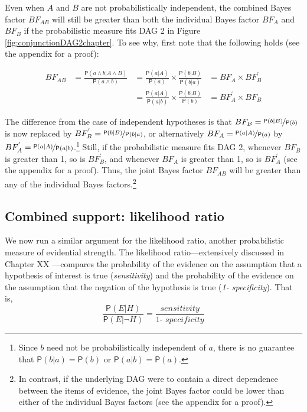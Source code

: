\documentclass[
  10pt,
  dvipsnames,enabledeprecatedfontcommands]{scrartcl}
\newcommand{\pr}[1]{\ensuremath{\mathsf{P}(#1)}}
\begin{document}
Even when \(A\) and \(B\) are not probabilistically independent, the
combined Bayes factor \(BF_{AB}\) will still be greater than both the
individual Bayes factor \(BF_{A}\) and \(BF_{B}\) if the probabilistic
measure fits \textsf{DAG 2} in Figure \ref{fig:conjunctionDAG2chapter}.
To see why, first note that the following holds (see the appendix for a
proof):

\begin{align}
BF_{AB}&= \frac{\pr{a \wedge b\vert A\wedge B}}{\pr{a \wedge b}}&= \frac{\pr{a |A}}{\pr{a}} \times \frac{\pr{b |B}}{\pr{b|a}}&=  BF_{A}\times BF^{'}_{B} \nonumber \\
& & = \frac{\pr{a |A}}{\pr{a | b}} \times \frac{\pr{b |B}}{\pr{b}}& =  BF^{'}_{A}\times BF_{B}  \nonumber 
 \end{align}

\noindent The difference from the case of independent hypotheses is that
\(BF_B=\nicefrac{\pr{b \vert B}}{\pr{b}}\) is now replaced by
\(BF^{'}_B=\nicefrac{\pr{b \vert B}}{\pr{b\vert a}}\), or alternatively
\(BF_A=\nicefrac{\pr{a \vert A}}{\pr{a}}\) by
\(BF^{'}_A=\nicefrac{\pr{a \vert A}}{\pr{a\vert b}}\).\footnote{Since
  \(b\) need not be probabilistically independent of \(a\), there is no
  guarantee that \(\pr{b \vert a}=\pr{b}\) or \(\pr{a \vert b}=\pr{a}\).}
Still, if the probabilistic measure fits \textsf{DAG 2}, whenever
\(BF_B\) is greater than 1, so is \(BF^{'}_B\), and whenever \(BF_A\) is
greater than 1, so is \(BF^{'}_A\) (see the appendix for a proof). Thus,
the joint Bayes factor \(BF_{AB}\) will be greater than any of the
individual Bayes factors.\footnote{In contrast, if the underlying
  \textsf{DAG} were to contain a direct dependence between the items of
  evidence, the joint Bayes factor could be lower than either of the
  individual Bayes factors (see the appendix for a proof).}

\hypertarget{combined-support-likelihood-ratio}{%
\subsection{Combined support: likelihood
ratio}\label{combined-support-likelihood-ratio}}

We now run a similar argument for the likelihood ratio, another
probabilistic measure of evidential strength. The likelihood
ratio---extensively discussed in Chapter XX
---compares the probability of the
evidence on the assumption that a hypothesis of interest is true
(\textit{sensitivity}) and the probability of the evidence on the
assumption that the negation of the hypothesis is true
(\textit{1- specificity}). That is,
\[\frac{\pr{E \vert H}}{\pr{E \vert \neg H}}=\frac{\textit{sensitivity}}{\textit{1- specificity}}\]
\end{document}
